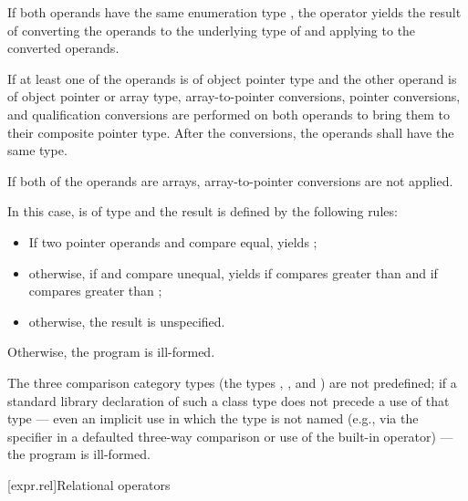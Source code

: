 \pnum
If both operands have the same enumeration type ,
the operator yields the result of
converting the operands to the underlying type of 
and applying \tcode{<=>} to the converted operands.

\pnum
If at least one of the operands is of object pointer type and
the other operand is of object pointer or array type,
array-to-pointer conversions,
pointer conversions,
and
qualification conversions
are performed on both operands
to bring them to their composite pointer type.
After the conversions, the operands shall have the same type.
\begin{note}
If both of the operands are arrays,
array-to-pointer conversions are not applied.
\end{note}
In this case,
 is of type  and
the result is defined by the following rules:
\begin{itemize}
\item
If two pointer operands  and  compare equal,
 yields ;
\item
otherwise, if  and  compare unequal,
 yields
if  compares greater than 
and
if  compares greater than ;
\item
otherwise, the result is unspecified.
\end{itemize}

\pnum
Otherwise, the program is ill-formed.

\pnum
The three comparison category types
(the types
,
, and
)
are not predefined;
if a standard library declaration
of such a class type does not precede
a use of that type ---
even an implicit use in which the type is not named
(e.g., via the  specifier
in a defaulted three-way comparison
or use of the built-in operator) --- the program is ill-formed.

[expr.rel]{Relational operators}%
%

